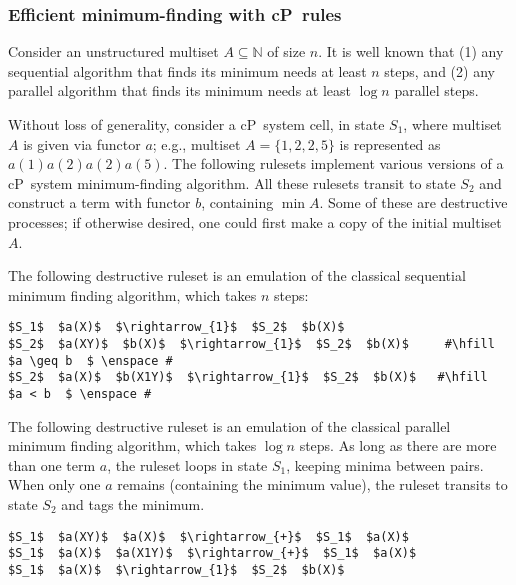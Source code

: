 \subsubsection{Efficient minimum-finding with cP~rules}\label{sec-min}

Consider an unstructured multiset $A \subseteq \mathbb{N}$ of size $n$. 
It is well known that (1) any sequential algorithm that finds its minimum needs at least $n$ steps, and 
(2) any parallel algorithm that finds its minimum needs at least $\log n$ parallel steps.

Without loss of generality, consider a cP~system cell, in state $S_1$, where multiset $A$ is given via functor $a$; 
e.g., multiset $A = \{ 1, 2, 2, 5 \}$ is represented as $a(1) a(2) a(2) a(5)$.
The following rulesets implement various versions of a cP~system minimum-finding algorithm.
All these rulesets transit to state $S_2$ and construct a term with functor $b$, containing $\min A$.
Some of these are destructive processes; if otherwise desired, one could first make a copy of the initial multiset $A$.

The following destructive ruleset is an emulation of the classical sequential minimum finding algorithm, which takes $n$ steps:

\lstset{xleftmargin=.5in, xrightmargin=.5in} 
\begin{lstlisting}
$S_1$  $a(X)$  $\rightarrow_{1}$  $S_2$  $b(X)$ 
$S_2$  $a(XY)$  $b(X)$  $\rightarrow_{1}$  $S_2$  $b(X)$     #\hfill  $a \geq b  $ \enspace #
$S_2$  $a(X)$  $b(X1Y)$  $\rightarrow_{1}$  $S_2$  $b(X)$   #\hfill  $a < b  $ \enspace #
\end{lstlisting}

The following destructive ruleset is an emulation of the classical parallel minimum finding algorithm, which takes $\log n$ steps.
As long as there are more than one term $a$, the ruleset loops in state $S_1$, keeping minima between pairs.
When only one $a$ remains (containing the minimum value), the ruleset transits to state $S_2$ and tags the minimum. 

\lstset{xleftmargin=.5in, xrightmargin=.5in} 
\begin{lstlisting}
$S_1$  $a(XY)$  $a(X)$  $\rightarrow_{+}$  $S_1$  $a(X)$     
$S_1$  $a(X)$  $a(X1Y)$  $\rightarrow_{+}$  $S_1$  $a(X)$    
$S_1$  $a(X)$  $\rightarrow_{1}$  $S_2$  $b(X)$  
\end{lstlisting}

